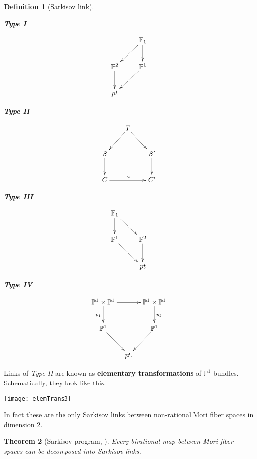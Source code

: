 \documentclass[a4paper,11pt]{amsart}
\newtheorem{theorem}{Theorem}[section]
\newtheorem{definition}[theorem]{Definition}
\newcommand{\PP}{\mathbb{P}}
\renewcommand{\FF}{\mathbb{F}}
\begin{document}
\begin{definition}[{Sarkisov link}]
	\noindent
	\begin{minipage}{.25\linewidth}
		\begin{center}
			\textbf{Type I}
		\end{center}
		\[
		\xymatrix{
			& \FF_1 \ar[ld] \ar[d] \\
			\PP^2  \ar[d] & \PP^1 \ar[dl]\\
			pt
		}
		\]
	\end{minipage}\hspace{-0.5cm}
	\begin{minipage}{.25\linewidth}
		\begin{center}
			\textbf{Type II}
		\end{center}
		\[
		\xymatrix@C=.7cm{
			 & T \ar[ld] \ar[rd] \\
			S  \ar[d] && S' \ar[d] \\
			C \ar[rr]^{\sim}&& C'
		}
		\]
	\end{minipage}\hspace{-0.5cm}
	\begin{minipage}{.25\linewidth}
		\begin{center}
			\textbf{Type III}
		\end{center}
		\[
		\xymatrix{
			\FF_1  \ar[d] \ar[rd] \\
			\PP^1  \ar[rd] & \PP^2 \ar[d]\\
			&pt
		}
		\]
	\end{minipage}\hspace{-0.2cm}
	\begin{minipage}{.25\linewidth}
		\begin{center}
			\textbf{Type IV}
		\end{center}
		\[
		\xymatrix@C=.3cm{
			\PP^1\times\PP^1 \ar[rr] \ar[d]_{p_1} && \PP^1\times\PP^1 \ar[d]^{p_2} \\
			\PP^1  \ar[rd] && \PP^1 \ar[ld]\\
			&pt.
		}
		\]
	\end{minipage}
\end{definition}

Links of \emph{Type II} are known as \textbf{elementary transformations} of $\PP^1$-bundles.
Schematically, they look like this:
\begin{center}
\texttt{[image: elemTrans3]}
\end{center}
In fact these are the only Sarkisov links between non-rational Mori fiber spaces in dimension $2$.

\begin{theorem}[{Sarkisov program, \cite{Cor95,HM13}}]\label{thm:Sarkisov}
	Every birational map between Mori fiber spaces can be decomposed into Sarkisov links.
\end{theorem}
\end{document}
